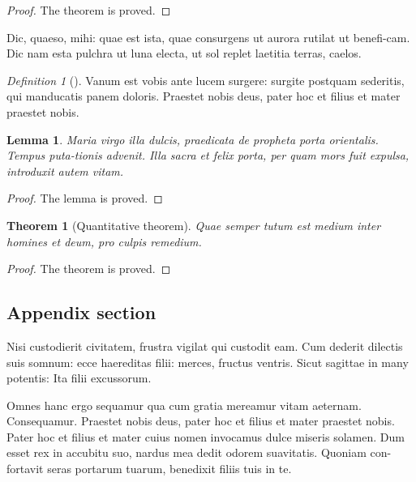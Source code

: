 \documentclass{infor}
\newtheorem{thm}{Theorem}
\newtheorem{lemma}{Lemma}
\theoremstyle{remark}
\newtheorem{defin}{Definition}
\begin{document}
\begin{proof}
The theorem is proved.
\end{proof}

Dic, quaeso, mihi: quae est ista, quae consurgens ut aurora rutilat
ut benefi-cam.  Dic nam esta pulchra ut luna electa, ut sol replet
laetitia terras, caelos.

\begin{defin}[\cite{powergrid1}]\label{clas}
Vanum est vobis ante lucem surgere: surgite postquam
sederitis, qui manducatis panem doloris. Praestet nobis deus, pater
hoc et filius et mater praestet nobis.
\end{defin}

\begin{lemma}
Maria virgo illa dulcis, praedicata de
propheta porta orientalis. Tempus puta-tionis advenit. Illa sacra et
felix porta, per quam mors fuit expulsa, introduxit autem vitam.
\end{lemma}

\begin{proof}
The lemma is proved.
\end{proof}

\begin{thm}[Quantitative theorem]
Quae semper tutum est medium inter homines et deum, pro culpis remedium.
\end{thm}

\begin{proof}
The theorem is proved.
\end{proof}


\begin{appendix}

\section{Appendix section}

Nisi custodierit civitatem,
frustra vigilat qui custodit eam. Cum dederit dilectis suis somnum:
ecce haereditas filii: merces, fructus ventris. Sicut sagittae in
many potentis: Ita filii excussorum.

\end{appendix}

\begin{acknowledgement}[title={Acknowledgments}]
Omnes hanc ergo sequamur qua cum gratia mereamur vitam aeternam.
Consequamur. Praestet nobis deus, pater hoc et filius et mater
praestet nobis.  Pater hoc et filius et mater cuius nomen invocamus
dulce miseris solamen. Dum esset rex in accubitu suo, nardus mea
dedit odorem suavitatis. Quoniam con-fortavit seras portarum tuarum,
benedixit filiis tuis in te.
\end{acknowledgement}
\end{document}
